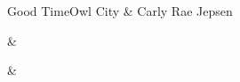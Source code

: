 \begin{Song}{Good Time}{Owl City \& Carly Rae Jepsen}
\vfill

\begin{multicols}{2}
\gridGroupNormal

\begin{Chords}
\hline
{} & \\\hline
\end{Chords}
\vfill
\columnbreak


\begin{Chords}
\hline
{} & \\\hline
\end{Chords}
\vfill
~
\end{multicols}

\vfill

\end{Song}


